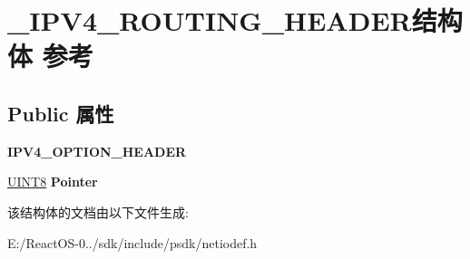 \hypertarget{struct___i_p_v4___r_o_u_t_i_n_g___h_e_a_d_e_r}{}\section{\+\_\+\+I\+P\+V4\+\_\+\+R\+O\+U\+T\+I\+N\+G\+\_\+\+H\+E\+A\+D\+E\+R结构体 参考}
\label{struct___i_p_v4___r_o_u_t_i_n_g___h_e_a_d_e_r}
\subsection*{Public 属性}
\begin{DoxyCompactItemize}
\item 
\mbox{\label{struct___i_p_v4___r_o_u_t_i_n_g___h_e_a_d_e_r_ab0a8e37b9f5a5d2a020b2f2ea29faa37}} 
{\bfseries I\+P\+V4\+\_\+\+O\+P\+T\+I\+O\+N\+\_\+\+H\+E\+A\+D\+ER}
\item 
\mbox{\label{struct___i_p_v4___r_o_u_t_i_n_g___h_e_a_d_e_r_a8b2e0d39ba9abdc909f3be5be6770c71}} 
\hyperlink{_processor_bind_8h_ab27e9918b538ce9d8ca692479b375b6a}{U\+I\+N\+T8} {\bfseries Pointer}
\end{DoxyCompactItemize}


该结构体的文档由以下文件生成\+:\begin{DoxyCompactItemize}
\item 
E\+:/\+React\+O\+S-\/0../sdk/include/psdk/netiodef.\+h\end{DoxyCompactItemize}
